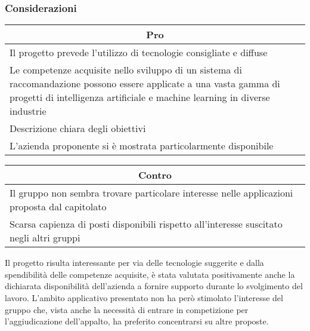 \subsubsection{Considerazioni}
\begin{minipage}[t]{0.45\linewidth}
    \vspace{0pt}
    {\renewcommand{\arraystretch}{1.5}
    \begin{tabular}{p{1\linewidth}}
        \multicolumn{1}{c}{\textbf{Pro}} \\
        \midrule
        Il progetto prevede l'utilizzo di tecnologie consigliate e diffuse \\
        Le competenze acquisite nello sviluppo di un sistema di raccomandazione possono essere applicate a una vasta gamma di progetti di intelligenza artificiale e machine learning in diverse industrie \\
        Descrizione chiara degli obiettivi \\
        L'azienda proponente si è mostrata particolarmente disponibile \\
        \hline
    \end{tabular}
    }
\end{minipage}
\hspace{0.05\linewidth}
\begin{minipage}[t]{0.45\linewidth}
    \vspace{0pt}
    {\renewcommand{\arraystretch}{1.5}
    \begin{tabular}{p{1\linewidth}}
        \multicolumn{1}{c}{\textbf{Contro}} \\
        \midrule
        Il gruppo non sembra trovare particolare interesse nelle applicazioni proposta dal capitolato \\
        Scarsa capienza di posti disponibili rispetto all'interesse suscitato negli altri gruppi \\
        \hline
    \end{tabular}
    }
\end{minipage}
\vspace{1em}

Il progetto risulta interessante per via delle tecnologie suggerite e dalla spendibilità delle competenze acquisite, è stata valutata positivamente anche la dichiarata disponibilità dell'azienda a fornire supporto durante lo svolgimento del lavoro.
L'ambito applicativo presentato non ha però stimolato l'interesse del gruppo che, vista anche la necessità di entrare in competizione per l'aggiudicazione dell'appalto, ha preferito concentrarsi su altre proposte.